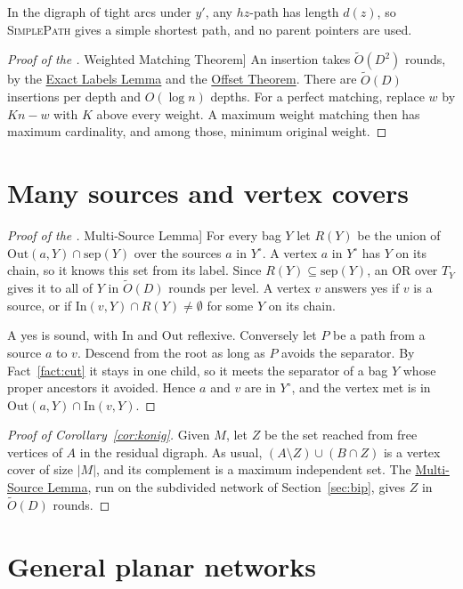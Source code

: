 \documentclass[11pt]{article}
\theoremstyle{definition}
\theoremstyle{remark}
\theoremstyle{plain}
\newcommand{\ThmWeight}{\hyperref[thm:weight]{Weighted Matching Theorem}}
\newcommand{\LemMS}{\hyperref[lem:ms]{Multi-Source Lemma}}
\newcommand{\LemLabels}{\hyperref[lem:labels]{Exact Labels Lemma}}
\newcommand{\ThmOff}{\hyperref[thm:off]{Offset Theorem}}
\newcommand{\AlgPath}{\textsc{SimplePath}}
\newcommand{\Ot}{\tilde O}
\newcommand{\sep}{\mathrm{sep}}
\newcommand{\In}{\mathrm{In}}
\newcommand{\Out}{\mathrm{Out}}
\begin{document}
In the digraph of tight arcs under $y'$, any $hz$-path has length $d(z)$, so \AlgPath{} gives a simple shortest
path, and no parent pointers are used.

\begin{proof}[Proof of the \ThmWeight{}]
An insertion takes $\Ot(D^2)$ rounds, by the \LemLabels{} and the \ThmOff{}. There are $\Ot(D)$ insertions per depth and
$O(\log n)$ depths. For a perfect matching, replace $w$ by $Kn-w$ with $K$ above every weight. A maximum weight matching then has
maximum cardinality, and among those, minimum original weight.
\end{proof}

\section{Many sources and vertex covers}\label{sec:ms}

\begin{proof}[Proof of the \LemMS{}]
For every bag $Y$ let $R(Y)$ be the union of $\Out(a,Y)\cap\sep(Y)$ over the sources $a$ in $Y^\circ$. A vertex $a$ in $Y^\circ$
has $Y$ on its chain, so it knows this set from its label. Since $R(Y)\subseteq\sep(Y)$, an OR over $T_Y$ gives it to all of $Y$
in $\Ot(D)$ rounds per level. A vertex $v$ answers yes if $v$ is a source, or if $\In(v,Y)\cap R(Y)\ne\emptyset$ for some $Y$ on
its chain.

A yes is sound, with $\In$ and $\Out$ reflexive. Conversely let $P$ be a path from a source $a$ to $v$. Descend from the root as long as
$P$ avoids the separator. By Fact~\ref{fact:cut} it stays in one child, so it meets the separator of a bag $Y$ whose proper
ancestors it avoided. Hence $a$ and $v$ are in $Y^\circ$, and the vertex met is in $\Out(a,Y)\cap\In(v,Y)$.
\end{proof}

\begin{proof}[Proof of Corollary~\ref{cor:konig}]
Given $M$, let $Z$ be the set reached from free vertices of $A$ in the residual digraph. As usual, $(A\setminus Z)\cup(B\cap Z)$ is
a vertex cover of size $|M|$, and its complement is a maximum independent set. The \LemMS{}, run on the subdivided network of
Section~\ref{sec:bip}, gives $Z$ in $\Ot(D)$ rounds.
\end{proof}

\section{General planar networks}\label{sec:general}
\end{document}
